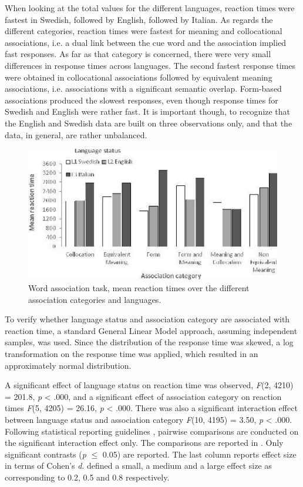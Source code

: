 \documentclass[output=paper,colorlinks,citecolor=brown,nonflat]{langsci/langscibook}
\begin{document}
When looking at the total values for the different languages, reaction times were fastest in Swedish, followed by English, followed by Italian. As regards the different categories, reaction times were fastest for meaning and collocational associations, i.e. a dual link between the cue word and the association implied fast responses. As far as that category is concerned, there were very small differences in response times across languages. The second fastest response times were obtained in collocational associations followed by equivalent meaning associations, i.e. associations with a significant semantic overlap. Form-based associations produced the slowest responses, even though response times for Swedish and English were rather fast. It is important though, to recognize that the English and Swedish data are built on three observations only, and that the data, in general, are rather unbalanced.

\begin{figure}
    \includegraphics[width=\textwidth]{figures/Gudmundson-fig4.pdf}
    \caption{Word association task, mean reaction times over the different association categories and languages.}
    \label{fig:gudmundson:4}
\end{figure}

To verify whether language status and association category are associated with reaction time, a standard General Linear Model approach, assuming independent samples, was used. Since the distribution of the response time was skewed, a log transformation on the response time was applied, which resulted in an approximately normal distribution.

A significant effect of language status on reaction time was observed, \textit{F}(2, 4210) = 201.8, \textit{p} < .000, and a significant effect of association category on reaction times \textit{F}(5, 4205) = 26.16, \textit{p} < .000. There was also a significant interaction effect between language status and association category \textit{F}(10, 4195) = 3.50, \textit{p} < .000. Following statistical reporting guidelines \citep{FieldEtAl2012}, pairwise comparisons are conducted on the significant interaction effect only. The comparisons are reported in . Only significant contrasts (\textit{p} ${\leq}$ 0.05) are reported. The last column reports effect size in terms of Cohen’s \textit{d}. \citet{Cohen1988} defined a small, a medium and a large effect size as corresponding to 0.2, 0.5 and 0.8 respectively.
\end{document}

